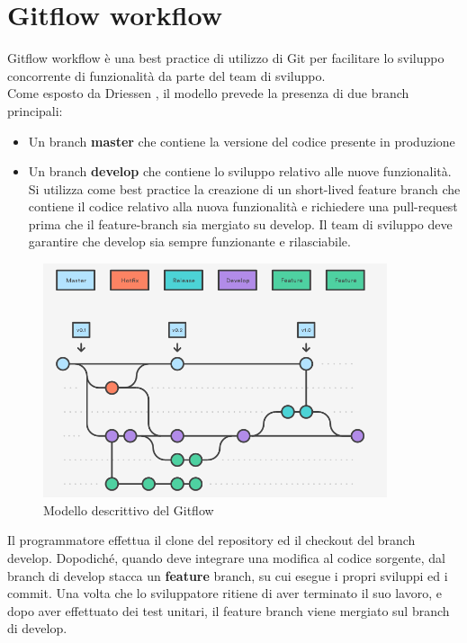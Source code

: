 \documentclass[a4paper, 12pt]{report}
\numberwithin{equation}{section}
\begin{document}
\section{Gitflow workflow}
Gitflow workflow è una best practice di utilizzo di Git per facilitare lo sviluppo concorrente di funzionalità da parte del team di sviluppo.\\
Come esposto da Driessen \cite{driessen-gitflow}, il modello prevede la presenza di due branch principali:
\begin{itemize}
    \item Un branch \textbf{master} che contiene la versione del codice presente in produzione
    \item Un branch \textbf{develop} che contiene lo sviluppo relativo alle nuove funzionalità. Si utilizza come best practice la creazione di un short-lived feature branch che contiene il codice relativo alla nuova funzionalità e richiedere una pull-request prima che il feature-branch sia mergiato su develop. Il team di sviluppo deve garantire che develop sia sempre funzionante e rilasciabile.
\end{itemize}
\begin{figure}
    \centering
    \includegraphics[width=0.9\textwidth]{imgs/gitflow.png}
    \caption{Modello descrittivo del Gitflow \cite{atlassian-doc}}
    \label{fig:gitflow}
\end{figure}
Il programmatore effettua il clone del repository ed il checkout del branch develop. Dopodiché, quando deve integrare una modifica al codice sorgente, dal branch di develop stacca un \textbf{feature} branch, su cui esegue i propri sviluppi ed i commit. Una volta che lo sviluppatore ritiene di aver terminato il suo lavoro, e dopo aver effettuato dei test unitari, il feature branch viene mergiato sul branch di develop.\\
\end{document}
